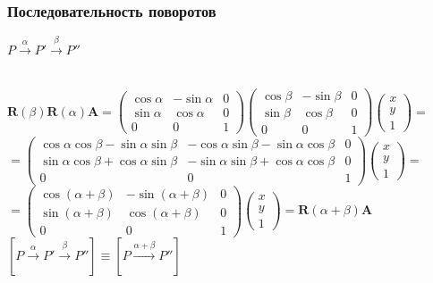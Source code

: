 \documentclass[10pt]{beamer}
\begin{document}
\begin{frame}\frametitle{Последовательность поворотов}
	

	
	$	P \xrightarrow{\alpha} P'  \xrightarrow{\beta} P'' $ \\ ~ \\ \pause
	
	$ \textbf{R}(\beta)\textbf{R}(\alpha) \textbf{A} =
	\begin{pmatrix}
		\cos\alpha&-\sin\alpha&0\\
		\sin\alpha&\cos\alpha&0\\
		0&0&1
	\end{pmatrix} 
	\begin{pmatrix}
		\cos\beta&-\sin\beta&0\\
		\sin\beta&\cos\beta&0\\
		0&0&1
	\end{pmatrix} 
	\begin{pmatrix}
		x\\
		y\\
		1
	\end{pmatrix}
	=
	$ \pause
	$=
	\begin{pmatrix}
		\cos\alpha\cos\beta - \sin\alpha\sin\beta & -\cos\alpha\sin\beta - \sin\alpha\cos\beta & 0 \\
		\sin\alpha\cos\beta + \cos\alpha\sin\beta & -\sin\alpha\sin\beta + \cos\alpha\cos\beta & 0 \\
		0 & 0 & 1
	\end{pmatrix}
	\begin{pmatrix}
		x\\
		y\\
		1
	\end{pmatrix}
	=
	$ \pause
	$
	=
	\begin{pmatrix}
		\cos(\alpha+\beta)&-\sin(\alpha+\beta)&0\\
		\sin(\alpha+\beta)&\cos(\alpha+\beta)&0\\
		0&0&1
	\end{pmatrix} 
	\begin{pmatrix}
	x\\
	y\\
	1
	\end{pmatrix}
	= \textbf{R}(\alpha + \beta)\textbf{A}
	$ \\[1em]
	$ [	P \xrightarrow{\alpha} P' \xrightarrow{\beta} P'' ] \equiv [P \xrightarrow{\alpha+\beta} P'']$ 
	
	
\end{frame}
\end{document}
